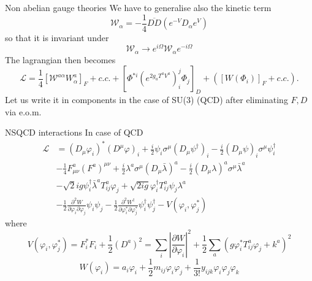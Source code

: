\documentclass[10pt]{beamer}
\begin{document}
\begin{frame}{Non abelian gauge theories}
We have to generalise also the kinetic term 
\begin{equation*}
    \mathcal{W}_{\alpha}=-\frac{1}{4} \overline{D D}\left(e^{-V} D_{\alpha} e^{V}\right)
\end{equation*}
so that it is invariant under 
\begin{equation*}
    \mathcal{W}_{\alpha} \rightarrow e^{i \Omega} \mathcal{W}_{\alpha} e^{-i \Omega}
\end{equation*}
The lagrangian then becomes 
\begin{equation*}
    \mathcal{L}=\frac{1}{4}\left[\mathcal{W}^{a \alpha} W_{\alpha}^{a}\right]_{F}+c . c .+\left[\Phi^{*i}\left(e^{2 g_a T^{a} V^{a}}\right)_{i}^j \Phi_{j}\right]_{D}+\left(\left[W\left(\Phi_{i}\right)\right]_F+c . c .\right) .
\end{equation*}
Let us write it in components in the case of SU(3) (QCD) after eliminating $F,D$ via e.o.m.
\end{frame}

\begin{frame}{NSQCD interactions}
In case of QCD
\begin{equation*}
    \begin{aligned}
        \mathcal{L} &=\left(D_{\mu} \varphi_{i}\right)^{*}\left(D^{\mu} \varphi\right)_{i}+\frac{i}{2} \psi_{i} \sigma^{\mu}\left(D_{\mu} \psi^{\dagger}\right)_{i}-\frac{i}{2}\left(D_{\mu} \psi\right)_{i} \sigma^{\mu} \psi^{\dagger}_{i}\\
        &-\frac{1}{4} F_{\mu \nu}^{a}\left(F^{a}\right)^{\mu \nu}+\frac{i}{2} \lambda^{a} \sigma^{\mu}\left(D_{\mu} \bar{\lambda}\right)^{a}-\frac{i}{2}\left(D_{\mu} \lambda\right)^{a} \sigma^{\mu} \bar{\lambda}^{a} \\
        &-\sqrt{2} i g \psi^{\dagger}_{i} \bar{\lambda}^{a} T_{i j}^{a} \varphi_{j}+\sqrt{2 i g} \varphi_{i}^{\dagger} T_{i j}^{a} \psi_{j} \lambda^{a} \\
        &-\frac{1}{2} \frac{\partial^{2} W}{\partial \varphi_{i} \partial \varphi_{j}} \psi_{i} \psi_{j}-\frac{1}{2} \frac{\partial^{2} W^{\dagger}}{\partial \varphi_{i}^{*} \partial \varphi_{j}^{*}} \psi^{\dagger}_{i} \psi^{\dagger}_{j}-V\left(\varphi_{i}, \varphi_{j}^{*}\right)
        \end{aligned}
\end{equation*}
where 
\begin{equation*}
    V\left(\varphi_{i}, \varphi_{j}^{*}\right)=F_{i}^{*} F_{i}+\frac{1}{2}\left(D^{a}\right)^{2}=\sum_{i}\left|\frac{\partial W}{\partial \varphi_{i}}\right|^{2}+\frac{1}{2} \sum_{a}\left(g \varphi_{i}^{*} T_{i j}^{a} \varphi_{j}+k^{a}\right)^{2}
\end{equation*}
\begin{equation*}
    W\left(\varphi_{i}\right)=a_{i} \varphi_{i}+\frac{1}{2} m_{i j} \varphi_{i} \varphi_{j}+\frac{1}{3 !} y_{i j k} \varphi_{i} \varphi_{j} \varphi_{k}
\end{equation*}
\end{frame}
\end{document}
